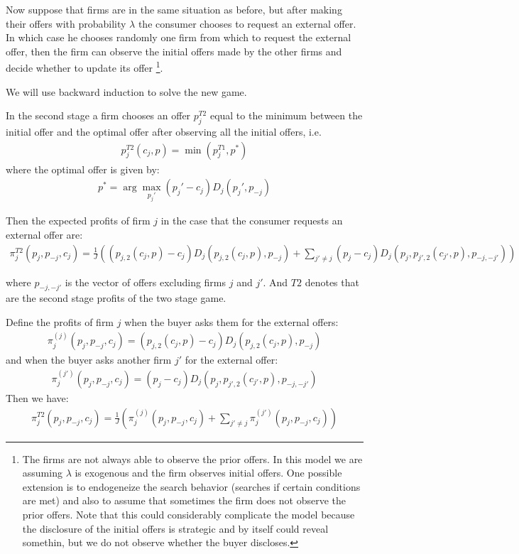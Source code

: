 \documentclass[12pt]{article}
\begin{document}
Now suppose that firms are in the same situation as before, but after making their offers with probability $\lambda$ the consumer chooses to request an external offer. In which case he chooses randomly one firm from which to request the external offer, then the firm can observe the initial offers made by the other firms and decide whether to update its offer \footnote{The firms are not always able to observe the prior offers. In this model we are assuming $\lambda$ is exogenous and the firm observes initial offers. One possible extension is to endogeneize the search behavior (searches if certain conditions are met) and also to assume that sometimes the firm does not observe the prior offers. Note that this could considerably complicate the model because the disclosure of the initial offers is strategic and by itself could reveal somethin, but we do not observe whether the buyer discloses. }.

We will use backward induction to solve the new game. 

In the second stage a firm chooses an offer $p_{j}^{T2}$ equal to the minimum between the initial offer and the optimal offer after observing all the initial offers, i.e. 
\begin{align}
\label{eq:base_equilibrium2}
    p_{j}^{T2}(c_j, p) = \min(p_j^{T1}, p^*)
\end{align}
where the optimal offer is given by: 
\begin{align}
    p^* = \arg \max_{p_j'} (p_j' - c_j) D_j(p_j', p_{-j}) 
\end{align}

Then the expected profits of firm $j$ in the case that the consumer requests an external offer are: 
\begin{align}\label{eq:profits_external}
    \pi_j^{T2}(p_j, p_{-j}, c_j) =  \frac{1}{J} \left( (p_{j,2}(c_j, p) - c_j) D_j(p_{j,2}(c_j, p), p_{-j}) + \sum_{j'\neq j} (p_j - c_j) D_j(p_j, p_{j',2}(c_{j'}, p), p_{-j, -j'}) \right)
\end{align}

where $p_{-j, -j'}$ is the vector of offers excluding firms $j$ and $j'$. And $T2$ denotes that are the second stage profits of the two stage game. 

Define the profits of firm $j$ when the buyer asks them for the external offers: 
\begin{align}
    \pi_j^{(j)}(p_j, p_{-j}, c_j) =  (p_{j,2}(c_j, p) - c_j) D_j(p_{j,2}(c_j, p), p_{-j})
\end{align}
and when the buyer asks another firm $j'$ for the external offer:
\begin{align}
    \pi_j^{(j')}(p_j, p_{-j}, c_j) =  (p_j - c_j) D_j(p_j, p_{j',2}(c_{j'}, p), p_{-j, -j'})
\end{align}
Then we have: 
\begin{align}\label{eq:profits_external2}
    \pi_j^{T2}(p_j, p_{-j}, c_j) =  \frac{1}{J} \left( \pi_j^{(j)}(p_j, p_{-j}, c_j)  + \sum_{j'\neq j} \pi_j^{(j')}(p_j, p_{-j}, c_j) \right)
\end{align}
\end{document}

